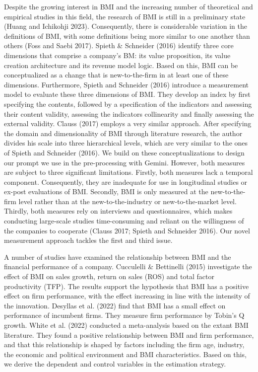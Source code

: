 \documentclass[
]{article}
\begin{document}
Despite the growing interest in BMI and the increasing number of
theoretical and empirical studies in this field, the research of BMI is
still in a preliminary state (Huang and Ichikohji 2023). Consequently,
there is considerable variation in the definitions of BMI, with some
definitions being more similar to one another than others (Foss and
Saebi 2017). Spieth \& Schneider (2016) identify three core dimensions
that comprise a company's BM: its value proposition, its value creation
architecture and its revenue model logic. Based on this, BMI can be
conceptualized as a change that is new-to-the-firm in at least one of
these dimensions. Furthermore, Spieth and Schneider (2016) introduce a
measurement model to evaluate these three dimensions of BMI. They
develop an index by first specifying the contents, followed by a
specification of the indicators and assessing their content validity,
assessing the indicators collinearity and finally assessing the external
validity. Clauss (2017) employs a very similar approach. After
specifying the domain and dimensionality of BMI through literature
research, the author divides his scale into three hierarchical levels,
which are very similar to the ones of Spieth and Schneider (2016). We
build on these conceptualizations to design our prompt we use in the
pre-processing with Gemini. However, both measures are subject to three
significant limitations. Firstly, both measures lack a temporal
component. Consequently, they are inadequate for use in longitudinal
studies or ex-post evaluations of BMI. Secondly, BMI is only measured at
the new-to-the-firm level rather than at the new-to-the-industry or
new-to-the-market level. Thirdly, both measures rely on interviews and
questionnaires, which makes conducting large-scale studies
time-consuming and reliant on the willingness of the companies to
cooperate (Clauss 2017; Spieth and Schneider 2016). Our novel
measurement approach tackles the first and third issue.

A number of studies have examined the relationship between BMI and the
financial performance of a company. Cucculelli \& Bettinelli (2015)
investigate the effect of BMI on sales growth, return on sales (ROS) and
total factor productivity (TFP). The results support the hypothesis that
BMI has a positive effect on firm performance, with the effect
increasing in line with the intensity of the innovation. Desyllas et al.
(2022) find that BMI has a small effect on performance of incumbent
firms. They measure firm performance by Tobin's Q growth. White et al.
(2022) conducted a meta-analysis based on the extant BMI literature.
They found a positive relationship between BMI and firm performance, and
that this relationship is shaped by factors including the firm age,
industry, the economic and political environment and BMI
characteristics. Based on this, we derive the dependent and control
variables in the estimation strategy.
\end{document}
